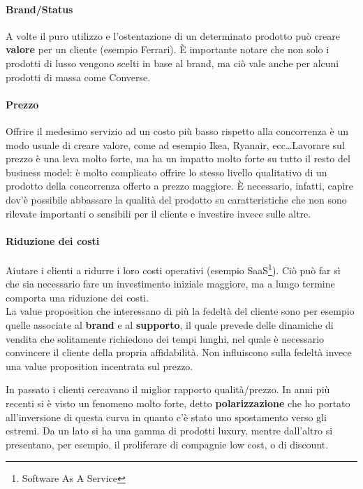 \paragraph*{Brand/Status} A volte il puro utilizzo e l'ostentazione di un
determinato prodotto può creare \textbf{valore} per un cliente (esempio
Ferrari). È importante notare che non solo i prodotti di lusso vengono scelti
in base al brand, ma ciò vale anche per alcuni prodotti di massa come Converse.

\paragraph*{Prezzo} Offrire il medesimo servizio ad un costo più basso rispetto
alla concorrenza è un modo usuale di creare valore, come ad esempio Ikea,
Ryanair, ecc\dots Lavorare sul prezzo è una leva molto forte, ma ha un impatto
molto forte su tutto il resto del business model: è molto complicato offrire lo
stesso livello qualitativo di un prodotto della concorrenza offerto a prezzo
maggiore. È necessario, infatti, capire dov'è possibile abbassare la qualità
del prodotto su caratteristiche che non sono rilevate importanti o sensibili
per il cliente e investire invece sulle altre.

\paragraph*{Riduzione dei costi} Aiutare i clienti a ridurre i loro costi
operativi (esempio SaaS\footnote{Software As A Service}). Ciò può far sì che
sia necessario fare un investimento iniziale maggiore, ma a lungo termine
comporta una riduzione dei costi.\\[0.3cm]

La value proposition che interessano di più la fedeltà del cliente sono per
esempio quelle associate al \textbf{brand} e al \textbf{supporto}, il quale
prevede delle dinamiche di vendita che solitamente richiedono dei tempi lunghi,
nel quale è necessario convincere il cliente della propria affidabilità. Non
influiscono sulla fedeltà invece una value proposition incentrata sul prezzo.

\noindent In passato i clienti cercavano il miglior rapporto qualità/prezzo. In
anni più recenti si è visto un fenomeno molto forte, detto
\textbf{polarizzazione} che ho portato all'inversione di questa curva
 in quanto c'è stato uno spostamento verso
gli estremi. Da un lato si ha una gamma di prodotti luxury, mentre dall'altro
si presentano, per esempio, il proliferare di compagnie low cost, o di discount.

